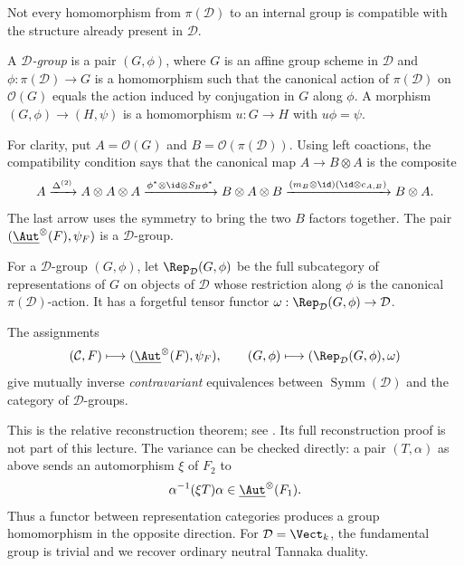 Not every homomorphism from $\pi(\mathcal D)$ to an internal group is
compatible with the structure already present in $\mathcal D$.

\begin{definition}
A \emph{$\mathcal D$-group} is a pair $(G,\phi)$, where $G$ is an affine
group scheme in $\mathcal D$ and $\phi:\pi(\mathcal D)\to G$ is a
homomorphism such that the canonical action of $\pi(\mathcal D)$ on
$\mathcal O(G)$ equals the action induced by conjugation in $G$ along
$\phi$.
A morphism $(G,\phi)\to(H,\psi)$ is a homomorphism $u:G\to H$ with
$u\phi=\psi$.
\end{definition}

For clarity, put $A=\mathcal O(G)$ and $B=\mathcal O(\pi(\mathcal D))$.
Using left coactions, the compatibility condition says that the canonical
map $A\to B\otimes A$ is the composite
\[
 A\xrightarrow{\Delta^{(2)}} A\otimes A\otimes A
 \xrightarrow{\phi^*\otimes\id\otimes S_B\phi^*}
 B\otimes A\otimes B
 \xrightarrow{(m_B\otimes\id)(\id\otimes c_{A,B})}
 B\otimes A.
\]
The last arrow uses the symmetry to bring the two $B$ factors together.
The pair $(\underline{\Aut}^{\otimes}(F),\psi_F)$ is a
$\mathcal D$-group.

\begin{definition}
For a $\mathcal D$-group $(G,\phi)$, let
$\Rep_{\mathcal D}(G,\phi)$ be the full subcategory of representations
of $G$ on objects of $\mathcal D$ whose restriction along $\phi$ is the
canonical $\pi(\mathcal D)$-action. It has a forgetful tensor functor
$\omega:\Rep_{\mathcal D}(G,\phi)\to\mathcal D$.
\end{definition}

\begin{theorem}
The assignments
\[
 (\mathcal C,F)\longmapsto
 (\underline{\Aut}^{\otimes}(F),\psi_F),
 \qquad
 (G,\phi)\longmapsto
 (\Rep_{\mathcal D}(G,\phi),\omega)
\]
give mutually inverse \emph{contravariant} equivalences between
$\operatorname{Symm}(\mathcal D)$ and the category of $\mathcal D$-groups.
\end{theorem}

This is the relative reconstruction theorem; see
\cite[\S4, Theorem 4.2.1]{CEOIncompressible}. Its full reconstruction
proof is not part of this lecture. The variance can be checked directly:
a pair $(T,\alpha)$ as above sends an automorphism $\xi$ of $F_2$ to
\[
 \alpha^{-1}(\xi T)\alpha
       \in\underline{\Aut}^{\otimes}(F_1).
\]
Thus a functor between representation categories produces a group
homomorphism in the opposite direction. For $\mathcal D=\Vect_k$,
the fundamental group is trivial and we recover ordinary neutral
Tannaka duality.

